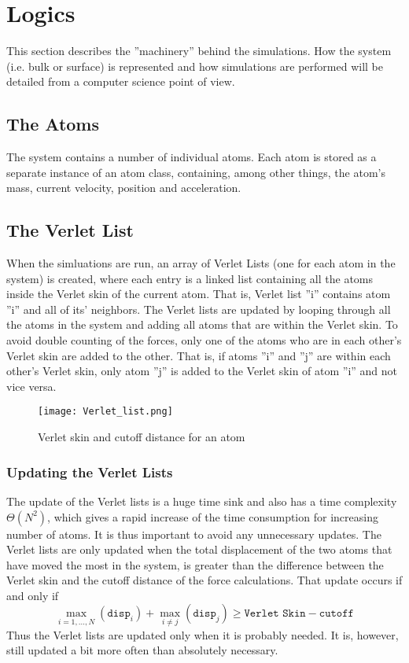 \section{Logics}
This section describes the ''machinery'' behind the simulations. How the system (i.e. bulk or surface) is represented and how simulations are performed will be detailed from a computer science point of view.
\subsection{The Atoms}
The system contains a number of individual atoms. Each atom is stored
as a separate instance of an atom class, containing, among other things, the
atom's mass, current velocity, position and acceleration.
\subsection{The Verlet List}
When the simluations are run, an array of Verlet Lists (one for each atom in the system) is created, where each entry is a linked list containing all the atoms inside the Verlet skin of the current atom. That is, Verlet list ''i'' contains atom ''i'' and all of its' neighbors. The Verlet lists are updated by looping through all the atoms in the system and adding all atoms that are within the Verlet skin. To avoid double counting of the forces, only one of the atoms who are in each other's Verlet skin are added to the other. That is, if atoms ''i'' and ''j'' are within each other's Verlet skin, only atom ''j'' is added to the Verlet skin of atom ''i'' and not vice versa.

\begin{figure}
\centering
\texttt{[image: Verlet\_list.png]}
\caption{Verlet skin and cutoff distance for an atom}
\label{fig:verlet_list}
\end{figure}
\subsubsection{Updating the Verlet Lists}
The update of the Verlet lists is a huge time sink and also has a time complexity $\Theta(N^2)$, which gives a rapid increase of the time consumption for increasing number of atoms. It is thus important to avoid any unnecessary updates. The Verlet lists are only updated when the total displacement of the two atoms that have moved the most in the system, is greater than the difference between the Verlet skin and the cutoff distance of the force calculations.
That update occurs if and only if
\[
\max_{i=1,\ldots,N}(\texttt{disp}_i) + \max_{i \neq j}(\texttt{disp}_j) \geq
\texttt{Verlet Skin} - \texttt{cutoff}
\]
Thus the Verlet lists are updated only when it is probably needed. It is, however, still updated a bit more often than absolutely necessary.

